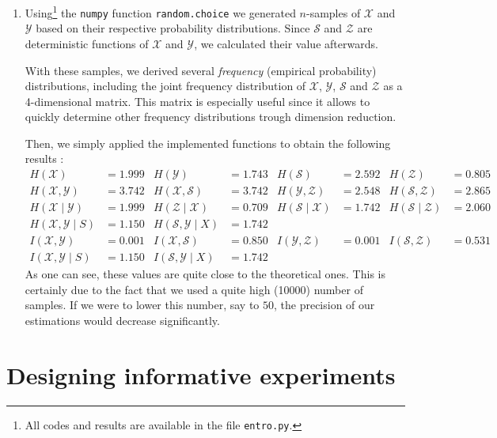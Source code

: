 \documentclass[a4paper, 12pt]{article}
\renewcommand{\S}{\mathcal{S}}
\newcommand{\X}{\mathcal{X}}
\newcommand{\Y}{\mathcal{Y}}
\newcommand{\Z}{\mathcal{Z}}
\begin{document}
\begin{enumerate}[leftmargin=*]
        \item Using\footnote{All codes and results are available in the file \texttt{entro.py}.} the \texttt{numpy} function \texttt{random.choice} we generated $n$-samples of $\X$ and $\Y$ based on their respective probability distributions. Since $\S$ and $\Z$ are deterministic functions of $\X$ and $\Y$, we calculated their value afterwards.
        
        With these samples, we derived several \emph{frequency} (empirical probability) distributions, including the joint frequency distribution of $\X$, $\Y$, $\S$ and $\Z$ as a 4-dimensional matrix. This matrix is especially useful since it allows to quickly determine other frequency distributions trough dimension reduction.
        
        Then, we simply applied the implemented functions to obtain the following results :
        \begin{align*}
            H(\X) & = \num{1.999} & H(\Y) & = \num{1.743} & H(\S) & = \num{2.592} & H(\Z) & = \num{0.805} \\
            H(\X, \Y) & = \num{3.742} & H(\X, \S) & = \num{3.742} & H(\Y, \Z) & = \num{2.548} & H(\S, \Z) & = \num{2.865} \\
            H(\X \mid \Y) & = \num{1.999} & H(\Z \mid \X) & = \num{0.709} & H(\S \mid \X) & = \num{1.742} & H(\S \mid \Z) & = \num{2.060} \\
            H(\X, \Y \mid S) & = \num{1.150} & H(\S, \Y \mid X) & = \num{1.742} \\
            I(\X, \Y) & = \num{0.001} & I(\X, \S) & = \num{0.850} & I(\Y, \Z) & = \num{0.001} & I(\S, \Z) & = \num{0.531} \\
            I(\X, \Y \mid S) & = \num{1.150} & I(\S, \Y \mid X) & = \num{1.742}
        \end{align*}
        As one can see, these values are quite close to the theoretical ones. This is certainly due to the fact that we used a quite high (\num{10000}) number of samples. If we were to lower this number, say to $50$, the precision of our estimations would decrease significantly.
    \end{enumerate}
    
    \newpage
    
    \section*{Designing informative experiments}
    
\end{document}
